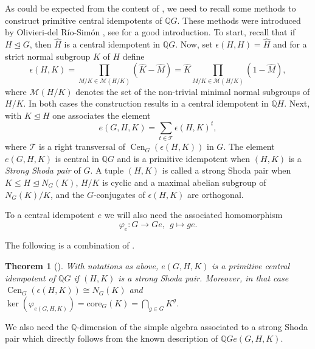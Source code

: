 \documentclass[a4paper,10pt]{amsart}
\newtheorem{theorem}[lemma]{Theorem}
\theoremstyle{definition}
\theoremstyle{remark}
\newcommand\Cen{\operatorname{Cen}}
\newcommand\wh{\widehat}
\newcommand{\Q}{{\mathbb Q}}
\begin{document}
As could be expected from the content of , we need to recall some methods to construct primitive central idempotents of $\Q G$. These methods were introduced by Olivieri-del R\'io-Sim\'on \cite{OlRiSi}, see \cite[Chapter 3]{GRG1} for a good introduction. To start, recall that if $ H\unlhd G$, then $\wh{H}$ is a central idempotent in $\Q G$. Now, set $\epsilon(H,H) = \wh{H}$ and for a strict normal subgroup $K$ of $H$ define
\begin{equation}\label{Def epsilon idempotents}
\epsilon (H,K) =  \prod\limits_{M/K \in \mathcal{M}(H/K)} (\wh{K} - \wh{M}) = \wh{K} \prod_{M/K \in  \mathcal{M}(H/K)} (1 - \wh{M}),
\end{equation}
where $ \mathcal{M}(H/K)$ denotes the set of the non-trivial minimal normal subgroups of $H/K$. In both cases the construction results in a central idempotent in $\Q H$. 
Next, with $K \unlhd H$ one associates the element 
\begin{equation}\label{Def e(G,H,K)}
e(G,H,K) = \sum_{t \in \mathcal{T}} \epsilon(H,K)^{t},
\end{equation}
where $\mathcal{T}$ is a right transversal of $\Cen_G(\epsilon(H,K))$ in $G$. The element $e(G,H,K)$ is central in $\Q G$ and is a primitive idempotent when $(H,K)$ is a {\it Strong Shoda pair} of $G$. A tuple $(H,K)$ is called a strong Shoda pair when $K \leq H \unlhd N_G(K)$, $H/K$ is cyclic and a maximal abelian subgroup of $N_G(K)/K$, and the $G$-conjugates of $\epsilon(H,K)$ are orthogonal.

To a central idempotent $e$ we will also need the associated homomorphism 
\begin{equation}\label{map associated to central id}
\varphi_e: G \rightarrow Ge, \ \ g \mapsto ge.
\end{equation}

The following is a combination of \cite[Proposition 3.4.1, Theorems 3.4.2 \& 3.5.5 and Problem 3.5.1]{GRG1}.

\begin{theorem}[\cite{OlRiSi}]\label{form of SSP idempotent result}
With notations as above, $e(G,H,K)$ is a primitive central idempotent of $\Q G$ if $(H,K)$ is a strong Shoda pair. Moreover, in that case $\Cen_G(\epsilon(H,K)) \cong N_G(K)$ and $\ker(\varphi_{e(G,H,K)}) = \text{core}_G(K) = \bigcap_{g \in G} K^g$.
\end{theorem}

We also need the $\Q$-dimension of the simple algebra associated to a strong Shoda pair which directly follows from the known description of $\Q G e(G,H,K)$.
\end{document}
